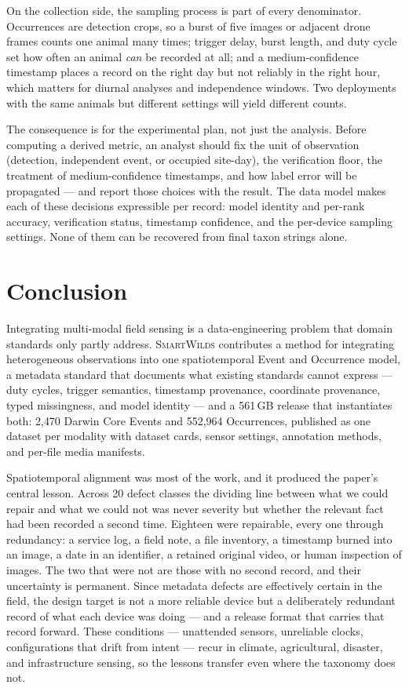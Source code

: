 \documentclass[sigconf]{acmart}
\newcommand{\smartwilds}{\textsc{SmartWilds}\xspace}
\begin{document}
On the collection side, the sampling process is part of every
denominator. Occurrences are detection crops, so a burst of five images
or adjacent drone frames counts one animal many times; trigger delay,
burst length, and duty cycle set how often an animal \emph{can} be
recorded at all; and a medium-confidence timestamp places a record on
the right day but not reliably in the right hour, which matters for
diurnal analyses and independence windows. Two deployments with the
same animals but different settings will yield different counts.

The consequence is for the experimental plan, not just the analysis.
Before computing a derived metric, an analyst should fix the unit of
observation (detection, independent event, or occupied site-day), the
verification floor, the treatment of medium-confidence timestamps, and
how label error will be propagated --- and report those choices with the
result. The data model makes each of these decisions expressible per
record: model identity and per-rank accuracy, verification status,
timestamp confidence, and the per-device sampling settings. None of
them can be recovered from final taxon strings alone.

\section{Conclusion}
\label{sec:conclusion}

Integrating multi-modal field sensing is a data-engineering problem
that domain standards only partly address. \smartwilds contributes a
method for integrating heterogeneous observations into one
spatiotemporal Event and Occurrence model, a metadata standard that
documents what existing standards cannot express --- duty cycles,
trigger semantics, timestamp provenance, coordinate provenance, typed
missingness, and model identity --- and a 561\,GB release that
instantiates both: 2{,}470 Darwin Core Events and 552{,}964 Occurrences,
published as one dataset per modality with dataset cards, sensor
settings, annotation methods, and per-file media manifests.

Spatiotemporal alignment was most of the work, and it produced the
paper's central lesson. Across 20 defect classes the dividing line
between what we could repair and what we could not was never severity
but whether the relevant fact had been recorded a second time. Eighteen
were repairable, every one through redundancy: a service log, a field
note, a file inventory, a timestamp burned into an image, a date in an
identifier, a retained original video, or human inspection of images.
The two that were not are those with no second record, and their
uncertainty is permanent. Since metadata defects are effectively
certain in the field, the design target is not a more reliable
device but a deliberately redundant record of what each device was
doing --- and a release format that carries that record forward. These
conditions --- unattended sensors, unreliable clocks, configurations
that drift from intent --- recur in climate, agricultural, disaster, and
infrastructure sensing, so the lessons transfer even where the taxonomy
does not.
\end{document}
